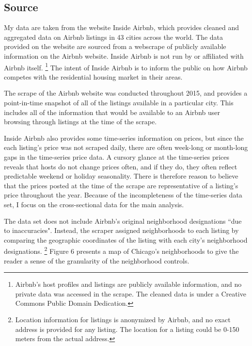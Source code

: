 \subsection{Source} 

My data are taken from the website Inside Airbnb, which provides cleaned and aggregated data on Airbnb listings in 43 cities across the world.\cite{insideairbnb} The data provided on the website are sourced from a webscrape of publicly available information on the Airbnb website. Inside Airbnb is not run by or affiliated with Airbnb itself.%
	\footnote{Airbnb's host profiles and listings are publicly available information, and no private data was accessed in the scrape. The cleaned data is under a Creative Commons Public Domain Dedication.} 
The intent of Inside Airbnb is to inform the public on how Airbnb competes with the residential housing market in their areas. 

The scrape of the Airbnb website was conducted throughout 2015, and provides a point-in-time snapshot of all of the listings available in a particular city. This includes all of the information that would be available to an Airbnb user browsing through listings at the time of the scrape. 

Inside Airbnb also provides some time-series information on prices, but since the each listing's price was not scraped daily, there are often week-long or month-long gaps in the time-series price data. A cursory glance at the time-series prices reveals that hosts do not change prices often, and if they do, they often reflect predictable weekend or holiday seasonality. There is therefore reason to believe that the prices posted at the time of the scrape are representative of a listing's price throughout the year. Because of the incompleteness of the time-series data set, I focus on the cross-sectional data for the main analysis.  

The data set does not include Airbnb's original neighborhood designations ``due to inaccuracies". Instead, the scraper assigned neighborhoods to each listing by comparing the geographic coordinates of the listing with each city's neighborhood designations.%
	\footnote{Location information for listings is anonymized by Airbnb, and no exact address is provided for any listing. The location for a listing could be 0-150 meters from the actual address.} 
Figure 6 presents a map of Chicago's neighborhoods to give the reader a sense of the granularity of the neighborhood controls. 

